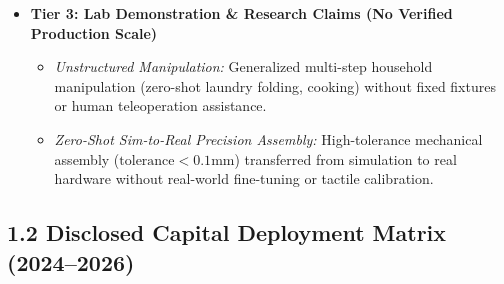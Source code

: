 \documentclass[11pt,a4paper]{article}
\begin{document}
\begin{itemize}
    \item \textbf{Tier 3: Lab Demonstration \& Research Claims (No Verified Production Scale)}
    \begin{itemize}
        \item \textit{Unstructured Manipulation:} Generalized multi-step household manipulation (zero-shot laundry folding, cooking) without fixed fixtures or human teleoperation assistance.
        \item \textit{Zero-Shot Sim-to-Real Precision Assembly:} High-tolerance mechanical assembly ($\text{tolerance} < 0.1\text{mm}$) transferred from simulation to real hardware without real-world fine-tuning or tactile calibration.
    \end{itemize}
\end{itemize}

\subsection{1.2 Disclosed Capital Deployment Matrix (2024--2026)}
\end{document}
